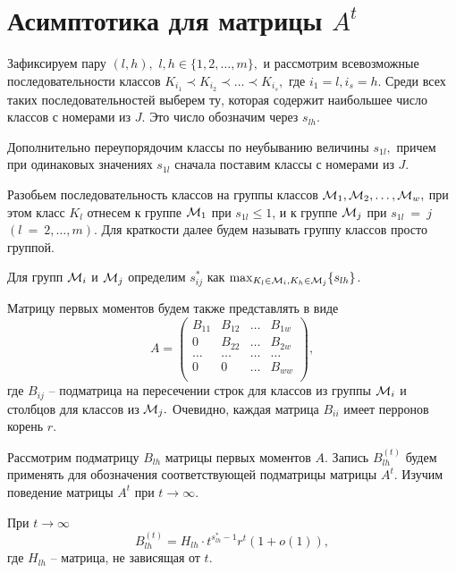 \documentclass[10pt]{article}
\begin{document}
\section{Асимптотика для матрицы $A^t$}
Зафиксируем пару $(l, h), $ $l,h \in \{1,2,\ldots,m\},$ и рассмотрим всевозможные последовательности классов $K_{i_1} \prec K_{i_2} \prec \ldots \prec K_{i_s},$ где $i_1=l, i_s=h.$ Среди всех таких последовательностей выберем ту, которая содержит наибольшее число классов с номерами из $J$. Это число обозначим через $s_{l h}.$ 
 
Дополнительно переупорядочим классы по неубыванию величины $s_{1l},$ причем при одинаковых значениях $s_{1l}$ сначала поставим классы с номерами из $J.$   

Разобьем последовательность классов на группы классов ${\cal M}_1,{\cal M}_2, \ldots, {\cal M}_w,$ при этом 
класс $K_l$ отнесем к группе ${\cal M}_1$ при $s_{1l} \le 1$, и к группе ${\cal M}_j$ при $s_{1l}~=~j$
$(l~=~2, \ldots, m).$
Для краткости далее будем называть группу классов просто группой.

Для групп ${\cal M}_i$ и ${\cal M}_j$ определим $s_{ij}^*$ как $\max_{K_l \in {\cal M}_i,K_h \in {\cal M}_j}\{s_{lh}\}$.

Матрицу первых моментов будем также представлять в виде 
$$  
A=\left(
\begin{array}{ccccc} 
B_{11} & B_{12} & \ldots & B_{1 w} \\
0 &    B_{22}   & \ldots & B_{2w} \\
\ldots & \ldots & \ldots & \ldots \\
0 & 0 &  \ldots & B_{w w} \\
\end{array}
\right),
$$
где $B_{ij}$ -- подматрица на пересечении строк для классов из группы  ${\cal M}_i$ и столбцов для классов из ${\cal M}_j.$ Очевидно, каждая матрица $B_{ii}$ имеет перронов корень $r.$

Рассмотрим подматрицу $B_{lh} $ матрицы первых моментов $A.$ Запись $B_{lh}^{(t)}$ будем применять для обозначения соответствующей подматрицы  матрицы $A^t.$ Изучим поведение матрицы $A^t$ при $t\rightarrow \infty.$

\begin{Theorem} \label{zhilteo1}
При $t\rightarrow \infty$
$$
B_{lh}^{(t)}=H_{lh} \cdot t^{s_{lh}^*-1} r^t (1+o(1)),
$$
где 
$H_{lh}$ -- матрица, не зависящая от $t.$
\end{Theorem} 
\end{document}
